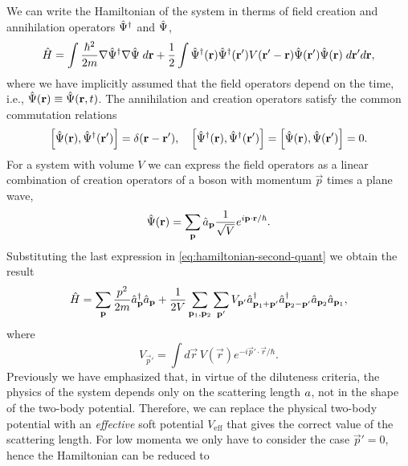 We can write the Hamiltonian of the system in therms of field creation and annihilation operators
${\hat{\Psi}}^\dagger$
and ${\hat{\Psi}}$,
%
\begin{equation}
    \label{eq:hamiltonian-second-quant}
    {\hat{H}} = \int \frac{\hbar^2}{2m}\nabla {\hat{\Psi}}^\dagger \nabla {\hat{\Psi}} \; d\mathbf r +
    \frac{1}{2}\int {\hat{\Psi}}^\dagger(\mathbf r) {\hat{\Psi}}^\dagger(\mathbf r')  V(\mathbf r' - \mathbf r) {\hat{\Psi}}(\mathbf r') {\hat{\Psi}}(\mathbf r) \; d \mathbf r' d \mathbf r,
\end{equation}
%
where we have implicitly assumed that the field operators depend on the time, i.e.,
${\hat{\Psi}}(\mathbf r) \equiv {\hat{\Psi}}(\mathbf r, t)$. The annihilation and creation operators satisfy the common commutation relations
%
\begin{align}
    \left[ {\hat{\Psi}}(\mathbf r), {\hat{\Psi}}^\dagger(\mathbf r') \right] = \delta(\mathbf r - \mathbf r'), \quad \left[ {\hat{\Psi}}^\dagger(\mathbf r), {\hat{\Psi}}^\dagger(\mathbf r') \right] =
    \left[ {\hat{\Psi}}(\mathbf r), {\hat{\Psi}}(\mathbf r') \right] = 0.
\end{align}
For a system with volume $V$ we can express the field operators as a linear combination of creation operators of a
boson with momentum $\vec p$ times a plane wave,
%
\begin{equation}
    {\hat{\Psi}}(\mathbf r) = \sum_{\mathbf p} {\hat{a}}_{\mathbf p} \frac{1}{\sqrt{V}} e^{i \mathbf p \cdot \mathbf r / \hbar}.
\end{equation}
%
Substituting the last expression in \eqref{eq:hamiltonian-second-quant} we obtain the result
%
\begin{equation}
    {\hat{H}} = \sum_{\mathbf p} \frac{p^2}{2m} {\hat{a}}^\dagger_{\mathbf p} {\hat{a}}_{\mathbf p} +
    \frac{1}{2V} \sum_{\mathbf p_1, \mathbf p_2} \sum_{\mathbf p'} V_{\mathbf p'} {\hat{a}}^\dagger_{\mathbf p_1 + \mathbf p'} {\hat{a}}^\dagger_{\mathbf p_2 - \mathbf p'} {\hat{a}}_{\mathbf p_2} {\hat{a}}_{\mathbf p_1},
\end{equation}
%
where
%
\begin{equation}
     V_{\vec p'} = \int  d\vec r \, V(\vec r) e^{-i \vec p' \cdot \vec r / \hbar}.
\end{equation}
%
Previously we have emphasized that, in virtue of the diluteness criteria, the physics of the system depends only on the
scattering length $a$, not in the shape of the two-body potential. Therefore, we can replace the physical
two-body potential with an \textit{effective} soft potential $V_\mathrm{eff}$ that gives the correct value
of the
scattering length.
For low momenta we only have to consider the case $\vec p' = 0$, hence the Hamiltonian can be reduced to
